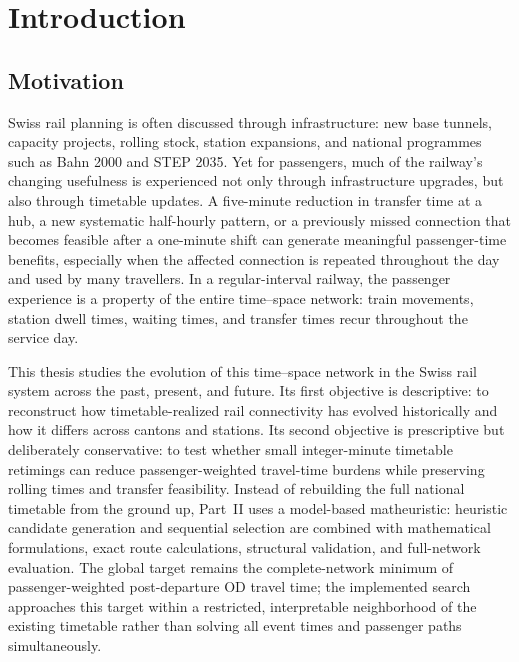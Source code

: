 \documentclass[preprint,12pt]{elsarticle}
\begin{document}
\clearpage


\setcounter{page}{1}
\section{Introduction}\label{sec:intro}

\subsection{Motivation}\label{sec:motivation}
Swiss rail planning is often discussed through infrastructure: new base tunnels, capacity projects, rolling stock, station expansions, and national programmes such as Bahn 2000 and STEP 2035. Yet for passengers, much of the railway's changing usefulness is experienced not only through infrastructure upgrades, but also through timetable updates. A five-minute reduction in transfer time at a hub, a new systematic half-hourly pattern, or a previously missed connection that becomes feasible after a one-minute shift can generate meaningful passenger-time benefits, especially when the affected connection is repeated throughout the day and used by many travellers. In a regular-interval railway, the passenger experience is a property of the entire time--space network: train movements, station dwell times, waiting times, and transfer times recur throughout the service day.

This thesis studies the evolution of this time--space network in the Swiss rail system across the past, present, and future. Its first objective is descriptive: to reconstruct how timetable-realized rail connectivity has evolved historically and how it differs across cantons and stations. Its second objective is prescriptive but deliberately conservative: to test whether small integer-minute timetable retimings can reduce passenger-weighted travel-time burdens while preserving rolling times and transfer feasibility. Instead of rebuilding the full national timetable from the ground up, Part~II uses a model-based matheuristic: heuristic candidate generation and sequential selection are combined with mathematical formulations, exact route calculations, structural validation, and full-network evaluation. The global target remains the complete-network minimum of passenger-weighted post-departure OD travel time; the implemented search approaches this target within a restricted, interpretable neighborhood of the existing timetable rather than solving all event times and passenger paths simultaneously.
\end{document}

